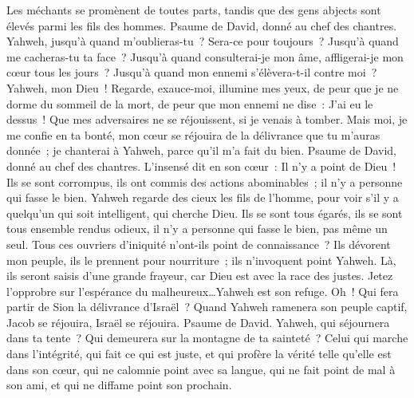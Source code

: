 \begin{multicols}{2}
Les méchants se promènent de toutes parts, tandis que des gens abjects sont élevés parmi les fils des hommes.
\VerseOne{}Psaume de David, donné au chef des chantres.
Yahweh, jusqu'à quand m'oublieras-tu~? Sera-ce pour toujours~? Jusqu'à quand me cacheras-tu ta face~?
Jusqu'à quand consulterai-je mon âme, affligerai-je mon cœur tous les jours~? Jusqu'à quand mon ennemi s'élèvera-t-il contre moi~?
Yahweh, mon Dieu~! Regarde, exauce-moi, illumine mes yeux, de peur que je ne dorme du sommeil de la mort,
de peur que mon ennemi ne dise~: J'ai eu le dessus~! Que mes adversaires ne se réjouissent, si je venais à tomber.
Mais moi, je me confie en ta bonté, mon cœur se réjouira de la délivrance que tu m'auras donnée~; je chanterai à Yahweh, parce qu'il m'a fait du bien.
\VerseOne{}Psaume de David, donné au chef des chantres. L'insensé dit en son cœur~: Il n'y a point de Dieu~! Ils se sont corrompus, ils ont commis des actions abominables~; il n'y a personne qui fasse le bien.
Yahweh regarde des cieux les fils de l'homme, pour voir s'il y a quelqu'un qui soit intelligent, qui cherche Dieu.
Ils se sont tous égarés, ils se sont tous ensemble rendus odieux, il n'y a personne qui fasse le bien, pas même un seul.
Tous ces ouvriers d'iniquité n'ont-ils point de connaissance~? Ils dévorent mon peuple, ils le prennent pour nourriture~; ils n'invoquent point Yahweh.
Là, ils seront saisis d'une grande frayeur, car Dieu est avec la race des justes.
Jetez l'opprobre sur l'espérance du malheureux…Yahweh est son refuge.
Oh~! Qui fera partir de Sion la délivrance d'Israël~? Quand Yahweh ramenera son peuple captif, Jacob se réjouira, Israël se réjouira.
\VerseOne{}Psaume de David. Yahweh, qui séjournera dans ta tente~? Qui demeurera sur la montagne de ta sainteté~?
Celui qui marche dans l'intégrité, qui fait ce qui est juste, et qui profère la vérité telle qu'elle est dans son cœur,
qui ne calomnie point avec sa langue, qui ne fait point de mal à son ami, et qui ne diffame point son prochain.

\end{multicols}
